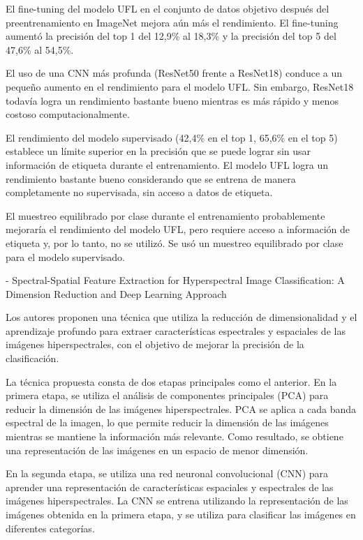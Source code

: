 \documentclass[article]{llncs}
\begin{document}
  El fine-tuning del modelo UFL en el conjunto de datos objetivo después del preentrenamiento en ImageNet mejora aún más 
  el rendimiento. El fine-tuning aumentó la precisión del top 1 del 12,9\% al 18,3\% y la precisión del top 5 del 47,6\% 
  al 54,5\%.

  El uso de una CNN más profunda (ResNet50 frente a ResNet18) conduce a un pequeño aumento en el rendimiento para el 
  modelo UFL. Sin embargo, ResNet18 todavía logra un rendimiento bastante bueno mientras es más rápido y menos costoso 
  computacionalmente.

  El rendimiento del modelo supervisado (42,4\% en el top 1, 65,6\% en el top 5) establece un límite superior en la 
  precisión que se puede lograr sin usar información de etiqueta durante el entrenamiento. El modelo UFL logra un 
  rendimiento bastante bueno considerando que se entrena de manera completamente no supervisada, sin acceso a datos de 
  etiqueta.

  El muestreo equilibrado por clase durante el entrenamiento probablemente mejoraría el rendimiento del modelo UFL, 
  pero requiere acceso a información de etiqueta y, por lo tanto, no se utilizó. Se usó un muestreo equilibrado por 
  clase para el modelo supervisado.

- Spectral-Spatial Feature Extraction for Hyperspectral Image Classification: A Dimension Reduction and Deep Learning 
Approach

  Los autores proponen una técnica que utiliza la reducción de dimensionalidad y el aprendizaje profundo para extraer 
  características espectrales y espaciales de las imágenes hiperspectrales, con el objetivo de mejorar la precisión de 
  la clasificación.

  La técnica propuesta consta de dos etapas principales como el anterior. En la primera etapa, se utiliza el análisis 
  de componentes principales (PCA) para reducir la dimensión de las imágenes hiperspectrales. PCA se aplica a cada 
  banda espectral de la imagen, lo que permite reducir la dimensión de las imágenes mientras se mantiene la información 
  más relevante. Como resultado, se obtiene una representación de las imágenes en un espacio de menor dimensión.

  En la segunda etapa, se utiliza una red neuronal convolucional (CNN) para aprender una representación de 
  características espaciales y espectrales de las imágenes hiperspectrales. La CNN se entrena utilizando la 
  representación de las imágenes obtenida en la primera etapa, y se utiliza para clasificar las imágenes en diferentes 
  categorías.
\end{document}
